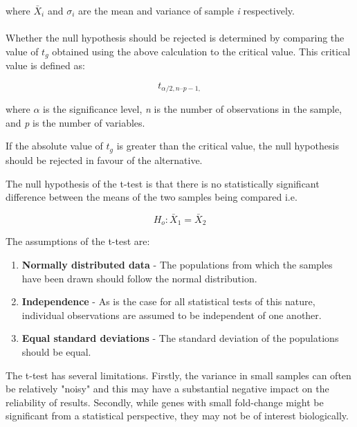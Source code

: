 where $\bar{X}_i$ and $\sigma_i$ are the mean and variance of sample \textit{i} respectively. \\
\\
Whether the null hypothesis should be rejected is determined by comparing the value of $t_g$ obtained using the above calculation to the critical value. This critical value is defined as: 

\begin{equation}
t_{\alpha/2,n–p-1,}
\end{equation}

where $\alpha$ is the significance level, \textit{n} is the number of observations in the  sample, and \textit{p} is the number of variables.

If the absolute value of $t_g$ is greater than the critical value, the null hypothesis should be rejected in favour of the alternative. 


The null hypothesis of the t-test is that there is no statistically significant difference between the means of the two samples being compared i.e. 

\begin{equation}
H_o: \bar{X}_1 = \bar{X}_2 \label{t-statistic}
\end{equation}


The assumptions of the t-test are: 

\begin{enumerate}
    \item \textbf{Normally distributed data} - The populations from which the samples have been drawn should follow the normal distribution. 
    \item \textbf{Independence} - As is the case for all statistical tests of this nature, individual observations are assumed to be independent of one another.
    \item \textbf{Equal standard deviations} - The standard deviation of the populations should be equal.
\end{enumerate}


The t-test has several limitations. Firstly, the variance in small samples can often be relatively "noisy" and this may have a substantial negative impact on the reliability of results. Secondly, while genes with small fold-change might be significant from a  statistical perspective, they may not be of interest biologically. 


